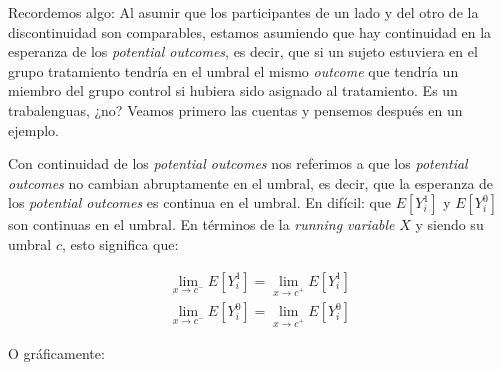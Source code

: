 \documentclass[
  letterpaper,
  DIV=11,
  numbers=noendperiod,
  oneside]{scrreprt}
\begin{document}
Recordemos algo: Al asumir que los participantes de un lado y del otro
de la discontinuidad son comparables, estamos asumiendo que hay
continuidad en la esperanza de los \emph{potential outcomes}, es decir,
que si un sujeto estuviera en el grupo tratamiento tendría en el umbral
el mismo \emph{outcome} que tendría un miembro del grupo control si
hubiera sido asignado al tratamiento. Es un trabalenguas, ¿no? Veamos
primero las cuentas y pensemos después en un ejemplo.

Con continuidad de los \emph{potential outcomes} nos referimos a que los
\emph{potential outcomes} no cambian abruptamente en el umbral, es
decir, que la esperanza de los \emph{potential outcomes} es continua en
el umbral. En difícil: que \(E[Y_i^1]\) y \(E[Y_i^0]\) son continuas en
el umbral. En términos de la \emph{running variable} \(X\) y siendo su
umbral \(c\), esto significa que:

\[
\begin{align*}
\lim_{x \to c^-} E[Y_i^1] = \lim_{x \to c^+} E[Y_i^1] \\
\lim_{x \to c^-} E[Y_i^0] = \lim_{x \to c^+} E[Y_i^0]
\end{align*}
\]

O gráficamente:
\end{document}
